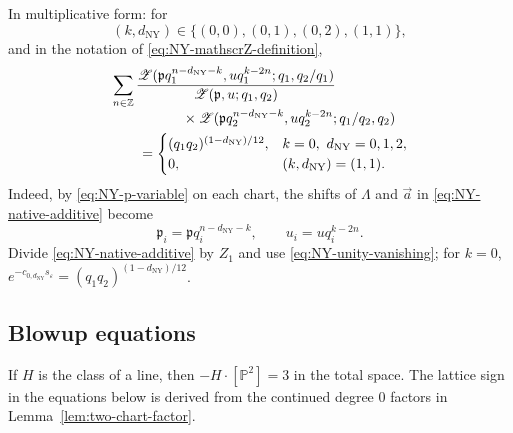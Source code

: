 \documentclass{amsart}
\theoremstyle{definition}
\numberwithin{equation}{section}
\newcommand{\Z}{\mathbb Z}
\newcommand{\eps}{\varepsilon}
\begin{document}
In multiplicative form: for
\[
 (k,d_{\mathrm{NY}})\in
 \{(0,0),(0,1),(0,2),(1,1)\},
\]
and in the notation of \eqref{eq:NY-mathscrZ-definition},
\begin{equation}
\begin{aligned}
 &\sum_{n\in\Z}
 \frac{
 \mathscr Z(\mathfrak p q_1^{n-d_{\mathrm{NY}}-k},u q_1^{k-2n};
 q_1,q_2/q_1)}
 {\mathscr Z(\mathfrak p,u;q_1,q_2)}\\[-1mm]
 &\hspace{18mm}\times
 \mathscr Z(\mathfrak p q_2^{n-d_{\mathrm{NY}}-k},u q_2^{k-2n};
 q_1/q_2,q_2)\\
 &\qquad=
 \begin{cases}
 (q_1q_2)^{(1-d_{\mathrm{NY}})/12},
   &k=0,\ d_{\mathrm{NY}}=0,1,2,\\
 0,&(k,d_{\mathrm{NY}})=(1,1).
 \end{cases}
\end{aligned}
\label{eq:NY-multiplicative}
\end{equation}
Indeed, by \eqref{eq:NY-p-variable} on each chart, the shifts of \(\Lambda\) and \(\vec a\) in \eqref{eq:NY-native-additive} become
\[
 \mathfrak p_i=\mathfrak p q_i^{n-d_{\mathrm{NY}}-k},\qquad
 u_i=uq_i^{k-2n}.
\]
Divide \eqref{eq:NY-native-additive} by \(Z_1\) and use \eqref{eq:NY-unity-vanishing}; for \(k=0\), \(e^{-c_{0,d_{\mathrm{NY}}}s_\eps} =(q_1q_2)^{(1-d_{\mathrm{NY}})/12}\).

\subsection{Blowup equations}
\label{subsec:P2-equations-recursion}
If \(H\) is the class of a line, then \(-H\cdot[\mathbb P^2]=3\) in the total space.  The lattice sign in the equations below is derived from the continued degree \(0\) factors in Lemma~\ref{lem:two-chart-factor}.
\end{document}
